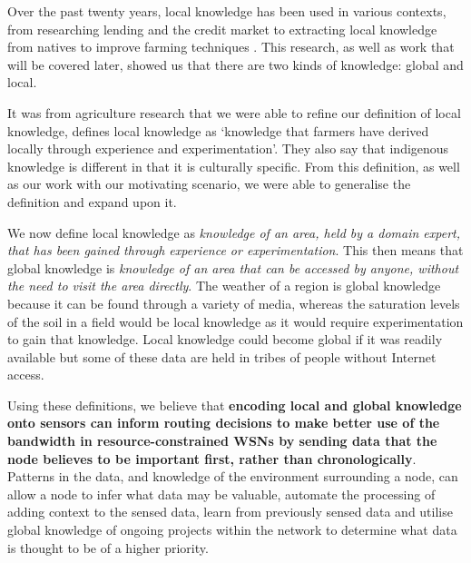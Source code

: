 Over the past twenty years, local knowledge has been used in various contexts, from researching lending and the credit market \cite{Stiglitz1990} to extracting local knowledge from natives to improve farming techniques \cite{DEWALT}. This research, as well as work that will be covered later, showed us that there are two kinds of knowledge: global and local. 

It was from agriculture research that we were able to refine our definition of local knowledge, \cite{Joshi2001} defines local knowledge as ‘knowledge that farmers have derived locally through experience and experimentation’. They also say that indigenous knowledge is different in that it is culturally specific. From this definition, as well as our work with our motivating scenario, we were able to generalise the definition and expand upon it.

We now define local knowledge as \textit{knowledge of an area, held by a domain expert, that has been gained through experience or experimentation}. This then means that global knowledge is \textit{knowledge of an area that can be accessed by anyone, without the need to visit the area directly}. The weather of a region is global knowledge because it can be found through a variety of media, whereas the saturation levels of the soil in a field would be local knowledge as it would require experimentation to gain that knowledge. Local knowledge could become global if it was readily available but some of these data are held in tribes of people without Internet access.

Using these definitions, we believe that \textbf{encoding local and global knowledge onto sensors can inform routing decisions to make better use of the bandwidth in resource-constrained WSNs by sending data that the node believes to be important first, rather than chronologically}. Patterns in the data, and knowledge of the environment surrounding a node, can allow a node to infer what data may be valuable, automate the processing of adding context to the sensed data, learn from previously sensed data and utilise global knowledge of ongoing projects within the network to determine what data is thought to be of a higher priority.

